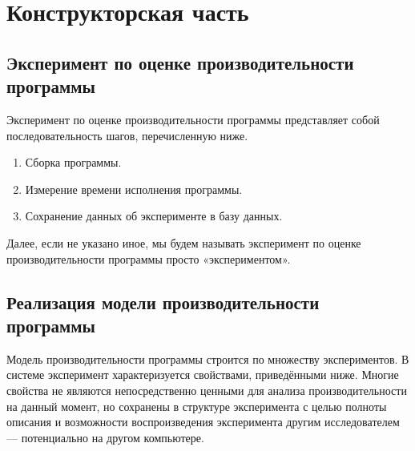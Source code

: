 \section{Конструкторская часть}

\subsection{Эксперимент по оценке производительности программы}

Эксперимент по оценке производительности программы представляет собой последовательность шагов, перечисленную ниже.

\begin{enumerate}
	\item Сборка программы.
	\item Измерение времени исполнения программы.
	\item Сохранение данных об эксперименте в базу данных.
\end{enumerate}

Далее, если не указано иное, мы будем называть эксперимент по оценке производительности программы просто «экспериментом».

\subsection{Реализация модели производительности программы}
\label{perf_mod_impl}

Модель производительности программы строится по множеству экспериментов. В системе эксперимент характеризуется свойствами, приведёнными ниже. Многие свойства не являются непосредственно ценными для анализа производительности на данный момент, но сохранены в структуре эксперимента с целью полноты описания и возможности воспроизведения эксперимента другим исследователем --- потенциально на другом компьютере.

